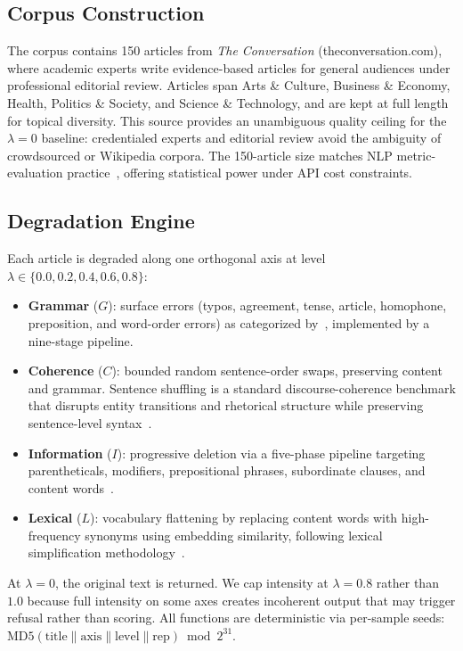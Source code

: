 \documentclass[11pt]{article}
\begin{document}
\subsection{Corpus Construction}

The corpus contains 150 articles from \emph{The Conversation}
(theconversation.com), where academic experts write evidence-based
articles for general audiences under professional editorial review.
Articles span Arts \& Culture, Business \& Economy, Health, Politics \&
Society, and Science \& Technology, and are kept at full length for
topical diversity. This source provides an unambiguous quality ceiling
for the $\lambda=0$ baseline: credentialed experts and editorial review
avoid the ambiguity of crowdsourced or Wikipedia corpora. The 150-article
size matches NLP metric-evaluation practice~\citep{kocmi2023large,liu2023geval},
offering statistical power under API cost constraints.

\subsection{Degradation Engine}

Each article is degraded along one orthogonal axis at level
$\lambda \in \{0.0, 0.2, 0.4, 0.6, 0.8\}$:
\begin{itemize}
    \item \textbf{Grammar} ($G$): surface errors (typos, agreement,
    tense, article, homophone, preposition, and word-order errors)
    as categorized by~\citet{attali2006automated}, implemented by a
    nine-stage pipeline.
    \item \textbf{Coherence} ($C$): bounded random sentence-order swaps,
    preserving content and grammar. Sentence shuffling is a standard
    discourse-coherence benchmark that disrupts entity transitions and
    rhetorical structure while preserving sentence-level syntax~\citep{barzilay2008modeling,lapata2005automatic}.
    \item \textbf{Information} ($I$): progressive deletion via a
    five-phase pipeline targeting parentheticals, modifiers,
    prepositional phrases, subordinate clauses, and content words~\citep{attali2006automated}.
    \item \textbf{Lexical} ($L$): vocabulary flattening by replacing
    content words with high-frequency synonyms using embedding
    similarity, following lexical simplification methodology~\citep{glavas2015simplifying}.
\end{itemize}
At $\lambda=0$, the original text is returned. We cap intensity at
$\lambda=0.8$ rather than $1.0$ because full intensity on some axes
creates incoherent output that may trigger refusal rather than scoring.
All functions are deterministic via per-sample seeds:
$\text{MD5}(\text{title} \| \text{axis} \| \text{level} \| \text{rep}) \bmod 2^{31}$.
\end{document}
